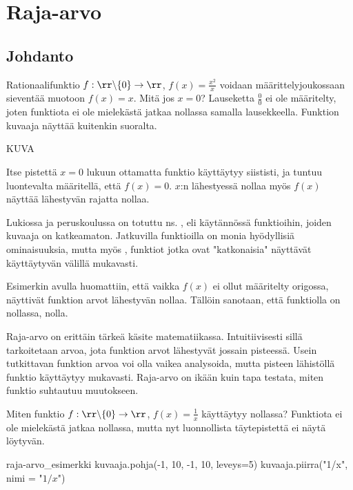 \chapter{Raja-arvo}

\section{Johdanto}

Rationaalifunktio $f: \rr \backslash \{0 \} \to \rr$, $f(x) = \frac{x^2}{x}$ voidaan määrittelyjoukossaan sieventää muotoon $f(x) = x$. Mitä jos $x = 0$? Lauseketta $\frac{0}{0}$ ei ole määritelty, joten funktiota ei ole mielekästä jatkaa nollassa samalla lausekkeella. Funktion kuvaaja näyttää kuitenkin suoralta.

KUVA

Itse pistettä $x = 0$ lukuun ottamatta funktio käyttäytyy siististi, ja tuntuu luontevalta määritellä, että $f(x) = 0$. $x$:n lähestyessä nollaa myös $f(x)$ näyttää lähestyvän rajatta nollaa.

Lukiossa ja peruskoulussa on totuttu ns. , eli käytännössä funktioihin, joiden kuvaaja on katkeamaton. Jatkuvilla funktioilla on monia hyödyllisiä ominaisuuksia, mutta myös , funktiot jotka ovat "katkonaisia" näyttävät käyttäytyvän välillä mukavasti.

Esimerkin avulla huomattiin, että vaikka $f(x)$ ei ollut määritelty origossa, näyttivät funktion arvot lähestyvän nollaa.  Tällöin sanotaan, että funktiolla on  nollassa, nolla.

Raja-arvo on erittäin tärkeä käsite matematiikassa. Intuitiivisesti sillä tarkoitetaan arvoa, jota funktion arvot lähestyvät jossain pisteessä. Usein tutkittavan funktion arvoa voi olla vaikea analysoida, mutta pisteen lähistöllä funktio käyttäytyy mukavasti. Raja-arvo on ikään kuin tapa testata, miten funktio suhtautuu muutokseen.

Miten funktio  $f: \rr \backslash \{0 \} \to \rr$, $f(x) = \frac{1}{x}$ käyttäytyy nollassa? Funktiota ei ole mielekästä jatkaa nollassa, mutta nyt luonnollista täytepistettä ei näytä löytyvän.

\begin{luoKuva}{raja-arvo_esimerkki}
    kuvaaja.pohja(-1, 10, -1, 10, leveys=5)
    kuvaaja.piirra("1/x", nimi = "$1/x$")
\end{luoKuva}

\begin{center}
\end{center}

